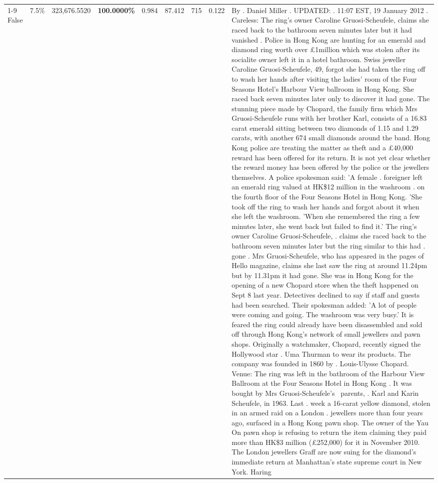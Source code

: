 \begin{table}[H]
\begin{tabular}{lllrlllll}
\cline{1-9} \cline{2-9}
False & 7.5\% & 323,676.5520 & \bfseries \color{red} 100.0000\% & 0.984 & 87.412 & 715 & 0.122 & By . Daniel Miller . UPDATED: . 11:07 EST, 19 January 2012 . Careless: The ring's owner Caroline Gruosi-Scheufele, claims she raced back to the bathroom seven minutes later but it had vanished . Police in Hong Kong are hunting for an emerald and diamond ring worth over £1million which was stolen after its socialite owner left it in a hotel bathroom. Swiss jeweller Caroline Gruosi-Scheufele, 49, forgot she had taken the ring off to wash her hands after visiting the ladies' room of the Four Seasons Hotel's Harbour View ballroom in Hong Kong. She raced back seven minutes later only to discover it had gone. The stunning piece made by Chopard, the family firm which Mrs Gruosi-Scheufele runs with her brother Karl, consists of a 16.83 carat emerald sitting between two diamonds of 1.15 and 1.29 carats, with another 674 small diamonds around the band. Hong Kong police are treating the matter as theft and a £40,000 reward has been offered for its return. It is not yet clear whether the reward money has been offered by the police or the jewellers themselves. A police spokesman said: 'A female . foreigner left an emerald ring valued at HK\$12 million in the washroom . on the fourth floor of the Four Seasons Hotel in Hong Kong. 'She took off the ring to wash her hands and forgot about it when she left the washroom. 'When she remembered the ring a few minutes later, she went back but failed to find it.' The ring's owner Caroline Gruosi-Scheufele, . claims she raced back to the bathroom seven minutes later but the ring similar to this had . gone . Mrs Gruosi-Scheufele, who has appeared in the pages of Hello magazine, claims she last saw the ring at around 11.24pm but by 11.31pm it had gone. She was in Hong Kong for the opening of a new Chopard store when the theft happened on Sept 8 last year. Detectives declined to say if staff and guests had been searched. Their spokesman added: 'A lot of people were coming and going. The washroom was very busy.' It is feared the ring could already have been disassembled and sold off through Hong Kong's network of small jewellers and pawn shops. Originally a watchmaker, Chopard, recently signed the Hollywood star . Uma Thurman to wear its products. The company was founded in 1860 by . Louis-Ulysse Chopard. Venue: The ring was left in the bathroom of the Harbour View Ballroom at the Four Seasons Hotel in Hong Kong . It was bought by Mrs Gruosi-Scheufele's  parents, . Karl and Karin Scheufele, in 1963. Last . week a 16-carat yellow diamond, stolen in an armed raid on a London . jewellers more than four years ago, surfaced in a Hong Kong pawn shop. The owner of the Yau On pawn shop is refusing to return the item claiming they paid more than HK\$3 million (£252,000) for it in November 2010. The London jewellers Graff are now suing for the diamond’s immediate return at Manhattan’s state supreme court in New York. Haring \\

\end{tabular}
\end{table}
